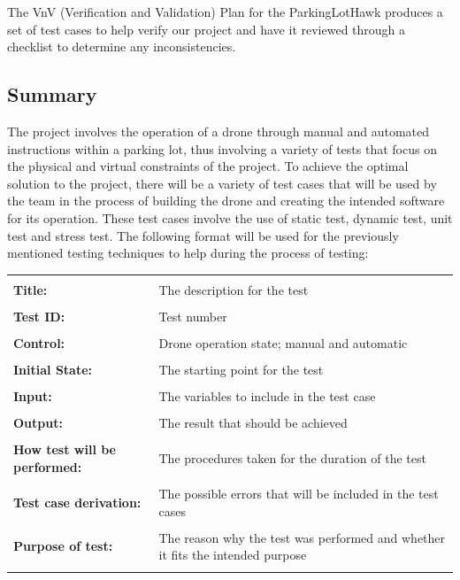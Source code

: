 \documentclass[12pt, titlepage]{article}
\begin{document}
The VnV (Verification and Validation) Plan for the ParkingLotHawk produces a set of test cases to help verify our project and have it reviewed through a checklist to determine any inconsistencies.


\subsection{Summary}

The project involves the operation of a drone through manual and automated instructions within a parking lot, thus involving a variety of tests that focus on the physical and virtual constraints of the project. To achieve the optimal solution to the project, there will be a variety of test cases that will be used by the team in the process of building the drone and creating the intended software for its operation. These test cases involve the use of static test, dynamic test, unit test and stress test. The following format will be used for the previously mentioned testing techniques to help during the process of testing:

\begin{center}
\begin{tabular}{|m{3cm} m{11cm}|}
\hline &\\
     \textbf{Title:} & The description for the test \\&\\
     \textbf{Test ID:} & Test number \\&\\
     \textbf{Control:} & Drone operation state; manual and automatic \\&\\
     \textbf{Initial State:} & The starting point for the test \\&\\
     \textbf{Input:} & The variables to include in the test case \\&\\
     \textbf{Output:} & The result that should be achieved \\&\\
     \textbf{How test will be performed:} & The procedures taken for the duration of the test \\&\\
     \textbf{Test case derivation:} & The possible errors that will be included in the test cases \\&\\
     \textbf{Purpose of test:} & The reason why the test was performed and whether it fits the intended purpose \\&\\
\hline
\end{tabular}
\end{center}
\end{document}
